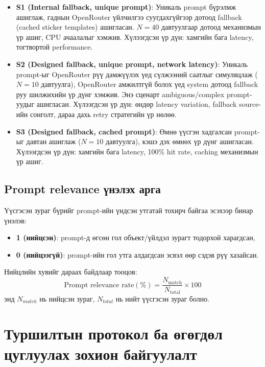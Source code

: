 \begin{itemize}
    \item \textbf{S1 (Internal fallback, unique prompt)}: Уникаль prompt бүрэлмж ашиглаж, гаднын OpenRouter үйлчилгээ суугдахгүйгээр дотоод fallback (cached sticker templates) ашигласан. $N=40$ давтуулгаар дотоод механизмын үр ашиг, CPU ачаалалыг хэмжив. Хүлээгдсэн үр дүн: хамгийн бага latency, тогтвортой performance.
    
    \item \textbf{S2 (Designed fallback, unique prompt, network latency)}: Уникаль prompt-ыг OpenRouter рүү дамжүүлэх үед сүлжээний саатлыг симуляцлаж ($N=10$ давтуулга), OpenRouter амжилтгүй болох үед system дотоод fallback руу шилжихийн үр дүнг хэмжив. Энэ сценарт ambiguous/complex prompt-уудыг ашигласан. Хүлээгдсэн үр дүн: өндөр latency variation, fallback source-ийн сонголт, дараа дахь retry стратегийн үр нөлөө.
    
    \item \textbf{S3 (Designed fallback, cached prompt)}: Өмнө үүсгэн хадгалсан prompt-ыг давтан ашиглаж ($N=10$ давтуулга), кэшэ дэх өмнөх үр дүнг ашигласан. Хүлээгдсэн үр дүн: хамгийн бага latency, 100\% hit rate, caching механизмын үр ашиг.
\end{itemize}

\subsection*{Prompt relevance үнэлэх арга}

 Үүсгэсэн зураг бүрийг prompt-ийн үндсэн утгатай тохирч байгаа эсэхээр бинар үнэлэв:

\begin{itemize}
    \item \textbf{1 (нийцсэн)}: prompt-д өгсөн гол объект/үйлдэл зурагт тодорхой харагдсан,
    \item \textbf{0 (нийцээгүй)}: prompt-ийн гол утга алдагдсан эсвэл өөр сэдэв рүү хазайсан.
\end{itemize}

Нийцлийн хувийг дараах байдлаар тооцов:
\begin{equation}
\label{eq:prompt_relevance}
\text{Prompt relevance rate}(\%) = \frac{N_{\mathrm{match}}}{N_{\mathrm{total}}} \times 100
\end{equation}
энд $N_{match}$ нь нийцсэн зураг, $N_{total}$ нь нийт үүсгэсэн зураг болно.

\section{Туршилтын протокол ба өгөгдөл цуглуулах зохион байгуулалт}

